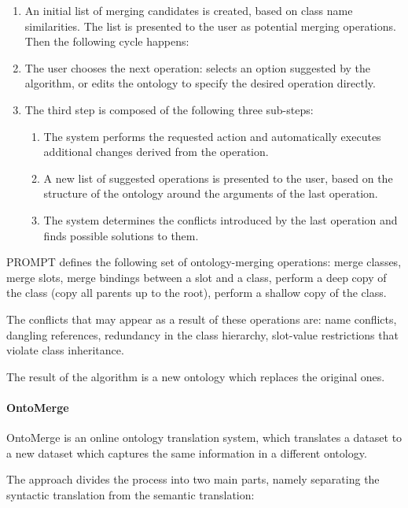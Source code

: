 \begin{enumerate}
\item An initial list of merging candidates is created, based on class
name similarities. The list is presented to the user as potential
merging operations. Then the following cycle happens: 
\item The user chooses the next operation: selects an option suggested
by the algorithm, or edits the ontology to specify the desired
operation directly. 
\item The third step is composed of the following three sub-steps: 

\begin{enumerate}
\item The system performs the requested action and automatically
executes additional changes derived from the operation. 
\item A new list of suggested operations is presented to the user, based
on the structure of the ontology around the arguments of the last
operation. 
\item The system determines the conflicts introduced by the last
operation and finds possible solutions to them. 
\end{enumerate}
\end{enumerate}
PROMPT defines the following set of ontology-merging operations: merge
classes, merge slots, merge bindings between a slot and a class,
perform a deep copy of the class (copy all parents up to the root),
perform a shallow copy of the class. 

The conflicts that may appear as a result of these operations are: name
conflicts, dangling references, redundancy in the class hierarchy,
slot-value restrictions that violate class inheritance. 

The result of the algorithm is a new ontology which replaces the
original ones. 

\paragraph{OntoMerge}
OntoMerge \cite{dou2002ontology_translation} is an online ontology translation system,
which translates a dataset to a new dataset which captures the same
information in a different ontology. 

The approach divides the process into two main parts, namely separating
the syntactic translation from the semantic translation: 

